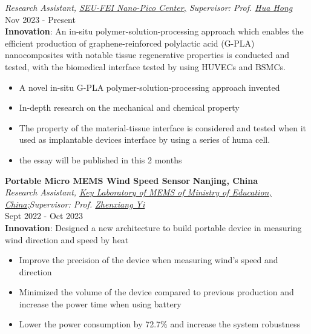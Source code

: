 \documentclass[letterpaper,11pt]{article}
\begin{document}
\textit{Research Assistant, {\href{http://www.seu-npc.com/}{SEU-FEI Nano-Pico Center,} Supervisor: Prof. {\href{https://ic.seu.edu.cn/honghua/main.htm}{Hua Hong}}}
}
\\
\hfill{Nov 2023 - Present}
\\
\textbf{Innovation}: An in-situ polymer-solution-processing approach which enables the efficient production of graphene-reinforced polylactic acid (G-PLA) nanocomposites with notable tissue regenerative properties is conducted and tested, with the biomedical interface tested by using HUVECs and BSMCs.\\
\begin{itemize}
    \item A novel in-situ G-PLA polymer-solution-processing approach invented
    \item In-depth research on the mechanical and chemical property
    \item The property of the material-tissue interface is considered and tested when it used as implantable devices interface by using a series of huma cell.
    \item the essay will be published in this 2 months
\end{itemize}
\vspace{2pt}

{\bf Portable Micro MEMS Wind Speed Sensor} \hfill{\textbf{Nanjing, China}}\\

\textit{Research Assistant, {\href{https://mems.seu.edu.cn/main.htm}{Key Laboratory of MEMS of Ministry of Education, China;}Supervisor: Prof. {\href{https://ic.seu.edu.cn/yizhenxiang/main.htm}{Zhenxiang Yi}}}
}
\\
\hfill{Sept 2022 - Oct 2023}
\\


\textbf{Innovation}: Designed a new architecture to build portable device in measuring wind direction and speed by heat\\ 
\begin{itemize}
    \item Improve the precision of the device when measuring wind's speed and direction
    \item Minimized the volume of the device compared to previous production and increase the power time when using battery
    \item Lower the power consumption by 72.7\% and increase the system robustness
\end{itemize}
\end{document}
